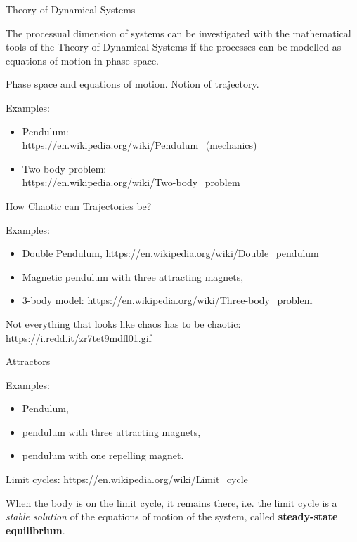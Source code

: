 \documentclass{beamer}
\begin{document}
\begin{frame}{Theory of Dynamical Systems}

The processual dimension of systems can be investigated with the mathematical
tools of the Theory of Dynamical Systems if the processes can be modelled as
equations of motion in phase space.

Phase space and equations of motion. Notion of trajectory.

Examples:\small
\begin{itemize}
\item Pendulum:\\ \url{https://en.wikipedia.org/wiki/Pendulum_(mechanics)}
\item Two body problem:\\ \url{https://en.wikipedia.org/wiki/Two-body_problem}
\end{itemize}
\end{frame}

\begin{frame}{How Chaotic can Trajectories be?} 

Examples: 
\begin{itemize}
\item Double Pendulum, \url{https://en.wikipedia.org/wiki/Double_pendulum}
\item Magnetic pendulum with three attracting magnets,
\item 3-body model: \url{https://en.wikipedia.org/wiki/Three-body_problem}
\end{itemize}

Not everything that looks like chaos has to be chaotic:\\
\url{https://i.redd.it/zr7tet9mdfl01.gif}

\end{frame}

\begin{frame}{Attractors}

Examples: 
\begin{itemize}
\item Pendulum,
\item pendulum with three attracting magnets,
\item pendulum with one repelling magnet.
\end{itemize}

Limit cycles: \url{https://en.wikipedia.org/wiki/Limit_cycle}

When the body is on the limit cycle, it remains there, i.e. the limit cycle is
a \emph{stable solution} of the equations of motion of the system, called
\textbf{steady-state equilibrium}.
    
\end{frame}
\end{document}
